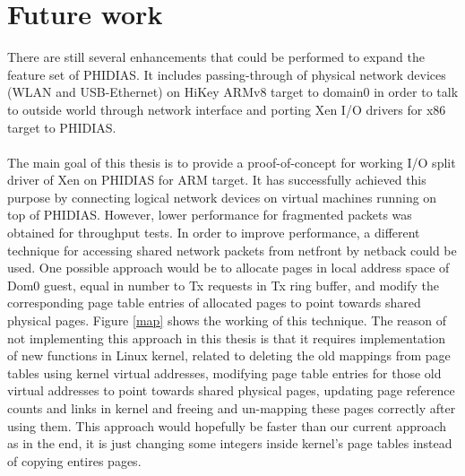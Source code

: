 \section{Future work \label{sec:Futurework}}
There are still several enhancements that could be performed to expand the feature set of PHIDIAS. It includes passing-through of physical network devices (WLAN and USB-Ethernet) on HiKey ARMv8 target to domain0 in order to talk to outside world through network interface and porting Xen I/O drivers for x86 target to PHIDIAS.
\\
\\
The main goal of this thesis is to provide a proof-of-concept for working I/O split driver of Xen on PHIDIAS for ARM target. It has successfully achieved this purpose by connecting logical network devices on virtual machines running on top of PHIDIAS. However, lower performance for fragmented packets was obtained for throughput tests. In order to improve performance, a different technique for accessing shared network packets from netfront by netback could be used. One possible approach would be to allocate pages in local address space of Dom0 guest, equal in number to Tx requests in Tx ring buffer, and modify the corresponding page table entries of allocated pages to point towards shared physical pages. Figure \ref{map} shows the working of this technique. The reason of not implementing this approach in this thesis is that it requires implementation of new functions in Linux kernel, related to deleting the old mappings from page tables using kernel virtual addresses, modifying page table entries for those old virtual addresses to point towards shared physical pages, updating page reference counts and links in kernel and freeing and un-mapping these pages correctly after using them. This approach would hopefully be faster than our current approach as in the end, it is just changing  some integers inside kernel's page tables instead of copying entires pages.


